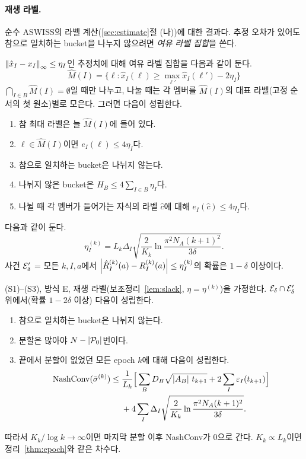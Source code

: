 \paragraph{재생 라벨.}
순수 ASWISS의 라벨 계산(\ref{sec:estimate}절 (나))에 대한 결과다. 추정 오차가 있어도 참으로 일치하는 bucket을 나누지 않으려면 \emph{여유 라벨 집합}을 쓴다.
\begin{lemma}[여유 라벨 집합]\label{lem:slack}
$\left\lVert \hat x_I-x_I\right\rVert_\infty\le\eta_I$인 추정치에 대해 여유 라벨 집합을 다음과 같이 둔다.
\[
\hat M(I)=\{\ell:\hat x_I(\ell)\ge\max_{\ell'}\hat x_I(\ell')-2\eta_I\}
\]
$\bigcap_{I\in B}\hat M(I)=\emptyset$일 때만 나누고, 나눌 때는 각 멤버를 $\hat M(I)$의 대표 라벨(고정 순서의 첫 원소)별로 모은다. 그러면 다음이 성립한다.
\begin{enumerate}[label=(\roman*)]
  \item 참 최대 라벨은 늘 $\hat M(I)$에 들어 있다.
  \item $\ell\in\hat M(I)$이면 $e_I(\ell)\le4\eta_I$다.
  \item 참으로 일치하는 bucket은 나뉘지 않는다.
  \item 나뉘지 않은 bucket은 $H_B\le4\sum_{I\in B}\eta_I$다.
  \item 나뉠 때 각 멤버가 들어가는 자식의 라벨 $\hat c$에 대해 $e_I(\hat c)\le4\eta_I$다.
\end{enumerate}
\end{lemma}

\begin{lemma}[재생 추정의 집중]\label{lem:replay}
다음과 같이 둔다.
\[
\eta_I^{(k)}=L_k\Delta_I\sqrt{\frac{2}{K_k}\ln\frac{\pi^2N_A(k+1)^2}{3\delta}}.
\]
사건 $\mathcal{E}'_\delta$ = {모든 $k,I,a$에서 $\left\lvert \hat R_I^{(k)}(a)-R_I^{(k)}(a)\right\rvert\le\eta_I^{(k)}$}의 확률은 $1-\delta$ 이상이다.
\end{lemma}

\begin{theorem}[저장 전략 재생의 수렴]\label{thm:replay}
(S1)–(S3), 방식 E, 재생 라벨(보조정리~\ref{lem:slack}, $\eta=\eta^{(k)}$)을 가정한다. $\mathcal{E}_\delta\cap\mathcal{E}'_\delta$ 위에서(확률 $1-2\delta$ 이상) 다음이 성립한다.
\begin{enumerate}[label=(\roman*)]
  \item 참으로 일치하는 bucket은 나뉘지 않는다.
  \item 분할은 많아야 $N-\left\lvert \mathcal{P}_0\right\rvert$번이다.
  \item 끝에서 분할이 없었던 모든 epoch $k$에 대해 다음이 성립한다.
  \begin{align*}
  \mathrm{NashConv}(\bar\sigma^{(k)})\le{}&\frac1{L_k}\Big[\sum_BD_B\sqrt{\left\lvert A_B\right\rvert\,t_{k+1}}+2\sum_I\varepsilon_I(t_{k+1})\Big]\\
  &+4\sum_I\Delta_I\sqrt{\frac2{K_k}\ln\frac{\pi^2N_A(k+1)^2}{3\delta}}.
  \end{align*}
\end{enumerate}
따라서 $K_k/\log k\to\infty$이면 마지막 분할 이후 NashConv가 0으로 간다. $K_k\propto L_k$이면 정리~\ref{thm:epoch}와 같은 차수다.
\end{theorem}

